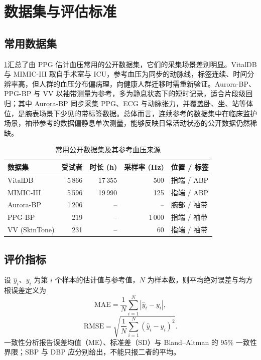 \section{数据集与评估标准}
\label{sec:datasets}

\subsection{常用数据集}
\label{sec:dataset}

\cref{tab:datasets}汇总了由 PPG 估计血压常用的公开数据集，它们的采集场景差别明显。VitalDB 与 MIMIC-III 取自手术室与 ICU，参考血压为同步的动脉线，标签连续、时间分辨率高，但人群的血压分布偏病理，向健康人群迁移时需重新验证\cite{lee2022vitaldb,johnson2016mimic}。Aurora-BP、PPG-BP 与 VV 以袖带测量为参考，多为静息状态下的短时记录，适合片段级回归\cite{mieloszyk2022comparison,liang2018ppg,toye2023vital}；其中 Aurora-BP 同步采集 PPG、ECG 与动脉张力，并覆盖卧、坐、站等体位，是腕表场景下少见的带标签数据。总体而言，连续参考的数据集中在临床监护场景，袖带参考的数据偏静息单次测量，能够反映日常活动状态的公开数据仍然稀缺。

\begin{table}[t]
\centering
\caption{常用公开数据集及其参考血压来源}
\label{tab:datasets}
\footnotesize
\setlength{\tabcolsep}{3.5pt}
\begin{tabular}{@{}lrrrl@{}}
\toprule
数据集 & 受试者 & 时长 (h) & 采样率 (Hz) & 位置 / 标签 \\
\midrule
VitalDB & 5\,866 & 17\,355 & 500 & 指端 / ABP \\
MIMIC-III & 5\,596 & 19\,990 & 125 & 指端 / ABP \\
Aurora-BP & 1\,206 & -- & -- & 腕部 / 袖带 \\
PPG-BP & 219 & -- & 1\,000 & 指端 / 袖带 \\
VV (SkinTone) & 231 & -- & 60 & 指端 / 袖带 \\
\bottomrule
\end{tabular}
\end{table}

\subsection{评价指标}
\label{sec:metrics}

设 $\hat{y}_i$、$y_i$ 为第 $i$ 个样本的估计值与参考值，$N$ 为样本数，则平均绝对误差与均方根误差定义为
\begin{equation}
\mathrm{MAE}=\frac{1}{N}\sum_{i=1}^{N}\left|\hat{y}_{i}-y_{i}\right|,
\end{equation}
\begin{equation}
\mathrm{RMSE}=\sqrt{\frac{1}{N}\sum_{i=1}^{N}\left(\hat{y}_{i}-y_{i}\right)^{2}}.
\end{equation}
一致性分析报告误差均值（ME）、标准差（SD）与 Bland--Altman 的 95\% 一致性界限；SBP 与 DBP 应分别给出，不能只报二者的平均。

